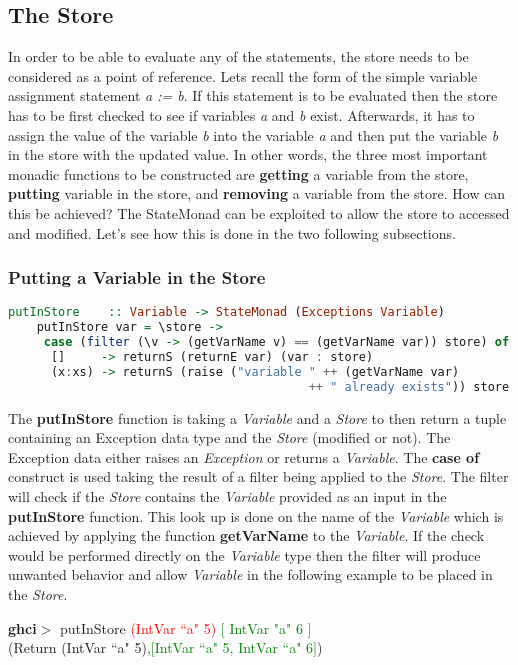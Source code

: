 \documentclass[a4paper, onecolumn]{article}
\begin{document}
    
    \subsection{The Store}
    In order to be able to evaluate any of the statements, the store needs to be considered as a point of reference. Lets recall the form of the simple variable assignment statement \textit{a := b}. If this statement is to be evaluated then the store has to be first checked to see if variables \textit{a} and \textit{b} exist. Afterwards, it has to assign the value of the variable \textit{b} into the variable \textit{a} and then put the variable \textit{b} in the store with the updated value. In other words, the three most important monadic functions to be constructed are \textbf{getting} a variable from the store, \textbf{putting} variable in the store, and \textbf{removing} a variable from the store. How can this be achieved? The StateMonad can be exploited to allow the store to accessed and modified. Let's see how this is done in the two following subsections.
    
    \subsubsection{Putting a Variable in the Store}
    
    \begin{tcolorbox}
    \begin{lstlisting}[language=Haskell] 
    putInStore    :: Variable -> StateMonad (Exceptions Variable) 
    putInStore var = \store -> 
     case (filter (\v -> (getVarName v) == (getVarName var)) store) of
      []     -> returnS (returnE var) (var : store)                               
      (x:xs) -> returnS (raise ("variable " ++ (getVarName var)
                                          ++ " already exists")) store
    \end{lstlisting}
    \end{tcolorbox}
    
    \noindent The \textbf{putInStore} function is taking a \textit{Variable} and a \textit{Store} to then return a tuple containing an Exception data type and the \textit{Store} (modified or not). The Exception data either raises an \textit{Exception} or returns a \textit{Variable}. The \textbf{case of} construct is used taking the result of a filter being applied to the \textit{Store}. The filter will check if the \textit{Store} contains the \textit{Variable} provided as an input in the \textbf{putInStore} function. This look up is done on the name of the \textit{Variable} which is achieved by applying the function \textbf{getVarName} to the \textit{Variable}. If the check would be performed directly on the \textit{Variable} type then the filter will produce unwanted behavior and allow \textit{Variable} in the following example to be placed in the \textit{Store}. 
    \begin{center}
            \textbf{ghci$>$} putInStore \textcolor{red}{(IntVar ``a" 5)} \textcolor{green}{ $\big[$ IntVar "a" 6 $\big]$} \\
             (Return (IntVar ``a" 5),\textcolor{green}{$\big[$IntVar ``a" 5, IntVar ``a" 6$\big]$})
        \end{center}
    
\end{document}

